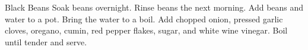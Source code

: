 \documentclass[../main.tex]{subfiles}
\begin{document}
\begin{recipe}{Black Beans}{}{}
    Soak beans overnight. Rinse beans the next morning.
    Add beans and water to a pot. Bring the water to a boil.
    Add chopped onion, pressed garlic cloves, oregano,
    cumin, red pepper flakes, sugar, and white wine vinegar.
    Boil until tender and serve.
\end{recipe}
\end{document}
